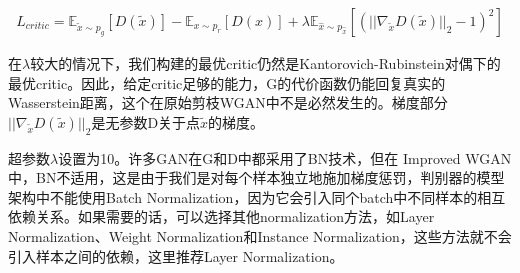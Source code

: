             \begin{align*}
            L_{critic} = \mathbb{E}_{\tilde{x}\sim p_g}[D(\tilde{x})] - \mathbb{E}_{x\sim p_r}[D(x)] + \lambda \mathbb{E}_{\hat{x}\sim p_{\hat{x}}}[(||\nabla_{\tilde{x}}D(\tilde{x})||_2 - 1)^2]
            \end{align*}
            \par
            在$\lambda$较大的情况下，我们构建的最优critic仍然是Kantorovich-Rubinstein对偶下的最优critic。因此，给定critic足够的能力，G的代价函数仍能回复真实的Wasserstein距离，这个在原始剪枝WGAN中不是必然发生的。梯度部分$||\nabla_{\tilde{x}}D(\tilde{x})||_2$是无参数D关于点$\tilde{x}$的梯度。
            \par
            超参数$\lambda$设置为10。许多GAN在G和D中都采用了BN技术，但在 Improved WGAN中，BN不适用，这是由于我们是对每个样本独立地施加梯度惩罚，判别器的模型架构中不能使用Batch Normalization，因为它会引入同个batch中不同样本的相互依赖关系。如果需要的话，可以选择其他normalization方法，如Layer Normalization、Weight Normalization和Instance Normalization，这些方法就不会引入样本之间的依赖，这里推荐Layer Normalization。

